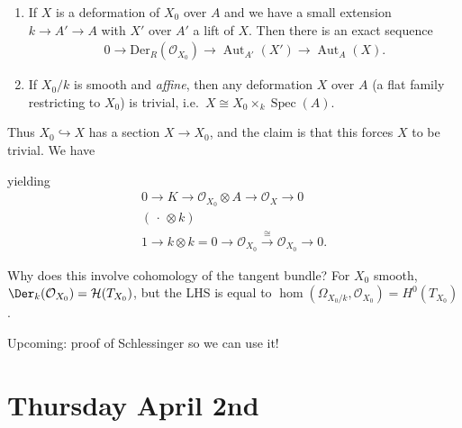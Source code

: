 \begin{enumerate}
\def\labelenumi{\arabic{enumi}.}
\item
  If \(X\) is a deformation of \(X_0\) over \(A\) and we have a small
  extension \(k \to A'\to A\) with \(X'\) over \(A'\) a lift of \(X\).
  Then there is an exact sequence
  \begin{align*}       0 \to \text{Der}_R({\mathcal{O}}_{X_0}) \to\operatorname{Aut}_{A'}(X') \to \operatorname{Aut}_A(X)       .\end{align*}
\item
  If \(X_0/k\) is smooth and \emph{affine}, then any deformation \(X\)
  over \(A\) (a flat family restricting to \(X_0\)) is trivial,
  i.e.~\(X \cong X_0 \times_k \operatorname{Spec}(A)\).
\end{enumerate}

\begin{center}
\end{center}

Thus \(X_0 \hookrightarrow X\) has a section \(X\to X_0\), and the claim
is that this forces \(X\) to be trivial. We have

\begin{center}
\end{center}

yielding
\begin{align*} 0 \to K \to {\mathcal{O}}_{X_0} \otimes A \to {\mathcal{O}}_X \to 0 \\ ({\,\cdot\,}\otimes k) \\ 1 \to k\otimes k = 0 \to {\mathcal{O}}_{X_0} \xrightarrow{\cong} {\mathcal{O}}_{X_0} \to 0 .\end{align*}

Why does this involve cohomology of the tangent bundle? For \(X_0\)
smooth, \(\Der_k({\mathcal{O}}_{X_0}) = \mathcal{H}(T_{X_0})\), but the
LHS is equal to
\(\hom( \Omega_{X_0/k}, {\mathcal{O}}_{X_0}) = H^0 (T_{X_0})\).

Upcoming: proof of Schlessinger so we can use it!

\hypertarget{thursday-april-2nd}{%
\section{Thursday April 2nd}\label{thursday-april-2nd}}

